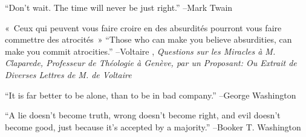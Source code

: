 \documentclass{article}%
\begin{document}
\linebreak%
\vspace{1mm}%
\begin{minipage}{\textwidth}%
\flushleft%
“Don't wait. The time will never be just right.”%
\linebreak%
\vspace{1mm}%
–Mark Twain%
\linebreak%
\vspace{1mm}%
\end{minipage}%
\linebreak%
\vspace{1mm}%
\begin{minipage}{\textwidth}%
\flushleft%
«~Ceux qui peuvent vous faire croire en des absurdités pourront vous faire commettre des atrocités~»%
\linebreak%
\vspace{1mm}%
“Those who can make you believe absurdities, can make you commit atrocities.”%
\linebreak%
–Voltaire%
, \textit{Questions sur les Miracles à M. Claparede, Professeur de Théologie à Genève, par un Proposant: Ou Extrait de Diverses Lettres de M. de Voltaire}%
\linebreak%
\vspace{1mm}%
\end{minipage}%
\linebreak%
\vspace{1mm}%
\begin{minipage}{\textwidth}%
\flushleft%
“It is far better to be alone, than to be in bad company.”%
\linebreak%
\vspace{1mm}%
–George Washington%
\linebreak%
\vspace{1mm}%
\end{minipage}%
\linebreak%
\vspace{1mm}%
\begin{minipage}{\textwidth}%
\flushleft%
“A lie doesn't become truth, wrong doesn't become right, and evil doesn't become good, just because it's accepted by a majority.”%
\linebreak%
\vspace{1mm}%
–Booker T. Washington%
\linebreak%
\vspace{1mm}%
\end{minipage}%
\linebreak%
\vspace{1mm}%
\end{document}

